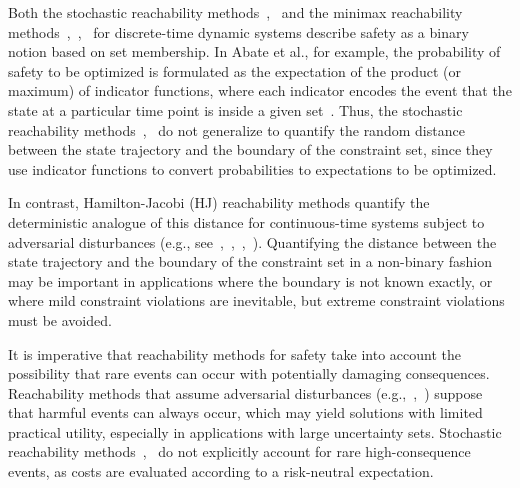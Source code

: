 \documentclass[letterpaper, 10 pt, conference]{ieeeconf}  %
\begin{document}
Both the stochastic reachability methods~\cite{abate2008probabilistic},~\cite{summers2010verification} and the minimax reachability methods~\cite{bertsekas1971control},~\cite{bertsekas1971minimax},~\cite{bertsekas2005dynamic} for discrete-time dynamic systems
describe safety as a binary notion based on set membership.
In Abate et al., for example, the probability of safety to be optimized is formulated as the expectation of the product (or maximum)
of indicator functions, where each indicator encodes the event that the state at a particular time point is inside a given set~\cite{abate2008probabilistic}.
Thus, the stochastic reachability methods~\cite{abate2008probabilistic},~\cite{summers2010verification} 
do not generalize to quantify the random distance between the state trajectory and the boundary of the constraint set,
since they use indicator functions to convert probabilities to expectations to be optimized.

In contrast, Hamilton-Jacobi (HJ) reachability methods quantify the deterministic analogue of this distance
for continuous-time systems subject to adversarial disturbances 
(e.g., see~\cite{bansal2017hamilton},~\cite{herbert2017fastrack},~\cite{EECS-2018-41},~\cite{mitchell2005toolbox}).
Quantifying the distance between the state trajectory and the boundary of the constraint set in a non-binary fashion
may be important in applications where the boundary is not known exactly,
or where mild constraint violations are inevitable, but extreme constraint violations must be avoided.

It is imperative that reachability methods for safety take into account the possibility that rare events can occur
with potentially damaging consequences. 
Reachability methods that assume adversarial disturbances (e.g.,~\cite{bansal2017hamilton},~\cite{bertsekas1971minimax}) suppose that harmful events can always occur,
which may yield solutions with limited practical utility, especially in applications with large uncertainty sets.
Stochastic reachability methods~\cite{abate2008probabilistic},~\cite{summers2010verification} do not explicitly account for rare high-consequence events,
as costs are evaluated according to a risk-neutral expectation.
\end{document}
